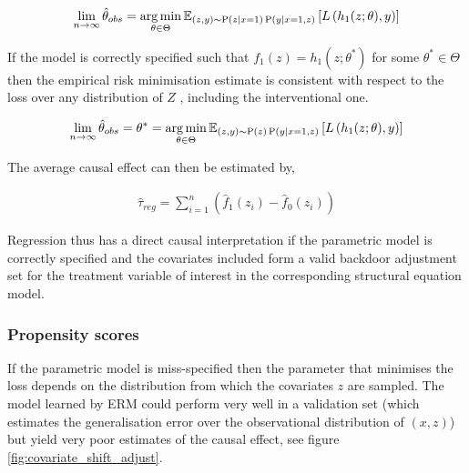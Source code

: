 \documentclass[11pt,a4paper,oneside]{book}
\newcommand{\Esub}[2]{\mathbb E_{#1}\left[{#2}\right]}
\newcommand{\argmin}{\operatornamewithlimits{arg\,min}}
\newcommand{\eqn}[1]{\begin{align}#1\end{align}}
\renewcommand{\P}[1]{\operatorname{P}\left(#1\right)}
\theoremstyle{plain}
\theoremstyle{definition}
\begin{document}
\eqn{
\lim_{n \rightarrow \infty}\hat{\theta}_{obs} = \argmin_{\theta \in \Theta} \Esub{(z,y) \sim \P{z|x=1}\P{y|x=1,z}}{L\left(h_1(z;\theta),y \right)}
}

If the model is correctly specified such that $f_1(z) = h_1(z;\theta^*)$ for some  $\theta^* \in \Theta$ then the empirical risk minimisation estimate is consistent with respect to the loss over any distribution of $Z$  \citep{Sugiyama2007}, including the interventional one. 

\eqn{
\lim_{n \rightarrow \infty}\hat{\theta}_{obs} = \theta^* = \argmin_{\theta \in \Theta} \Esub{(z,y) \sim \P{z}\P{y|x=1,z}}{L\left(h_1(z;\theta),y \right)}
}

The average causal effect can then be estimated by,

\eqn{
\label{eqn:cef_empirical_regression}
\hat{\tau}_{reg} = \sum_{i=1}^n \left(\hat{f}_1(z_i) - \hat{f}_0(z_i)\right)
}

Regression thus has a direct causal interpretation if the parametric model is correctly specified and the covariates included form a valid backdoor adjustment set for the treatment variable of interest in the corresponding structural equation model. 

\subsubsection{Propensity scores}
If the parametric model is miss-specified then the parameter that minimises the loss depends on the distribution from which the covariates $z$ are sampled. The model learned by ERM could perform very well in a validation set (which estimates the generalisation error over the observational distribution of $(x,z)$) but yield very poor estimates of the causal effect, see figure \ref{fig:covariate_shift_adjust}. 
\end{document}
